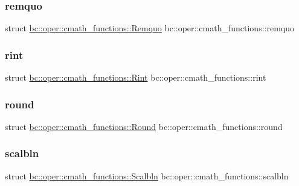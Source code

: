 \subsubsection{\texorpdfstring{remquo}{remquo}}
{\footnotesize\ttfamily struct \hyperlink{structbc_1_1oper_1_1cmath__functions_1_1Remquo}{bc\+::oper\+::cmath\+\_\+functions\+::\+Remquo}   bc\+::oper\+::cmath\+\_\+functions\+::remquo}

\mbox{\label{namespacebc_1_1oper_1_1cmath__functions_ac7106c7c743ea5fe837e866301a64309}} 
\subsubsection{\texorpdfstring{rint}{rint}}
{\footnotesize\ttfamily struct \hyperlink{structbc_1_1oper_1_1cmath__functions_1_1Rint}{bc\+::oper\+::cmath\+\_\+functions\+::\+Rint}   bc\+::oper\+::cmath\+\_\+functions\+::rint}

\mbox{\label{namespacebc_1_1oper_1_1cmath__functions_a0e239f2b015efe30c46b4a7224823bbf}} 
\subsubsection{\texorpdfstring{round}{round}}
{\footnotesize\ttfamily struct \hyperlink{structbc_1_1oper_1_1cmath__functions_1_1Round}{bc\+::oper\+::cmath\+\_\+functions\+::\+Round}   bc\+::oper\+::cmath\+\_\+functions\+::round}

\mbox{\label{namespacebc_1_1oper_1_1cmath__functions_ab0b9b7f20aadbdb8f4be104a4cb160e3}} 
\subsubsection{\texorpdfstring{scalbln}{scalbln}}
{\footnotesize\ttfamily struct \hyperlink{structbc_1_1oper_1_1cmath__functions_1_1Scalbln}{bc\+::oper\+::cmath\+\_\+functions\+::\+Scalbln}   bc\+::oper\+::cmath\+\_\+functions\+::scalbln}

